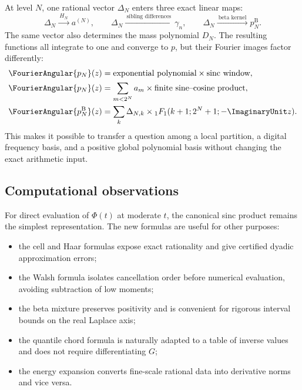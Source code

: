 \documentclass[11pt]{article}
\theoremstyle{definition}
\theoremstyle{remark}
\begin{document}
At level $N$, one rational vector $\Delta_N$ enters three exact linear maps:
\begin{equation}\label{p3:eq:commuting-maps}
 \Delta_N
 \xrightarrow{\ H_N\ }a^{(N)},
 \qquad
 \Delta_N\xrightarrow{\ \text{sibling differences}\ }\gamma_n,
 \qquad
 \Delta_N\xrightarrow{\ \text{beta kernel}\ }p_N^{\mathrm B}.
\end{equation}
The same vector also determines the mass polynomial $D_N$.  The resulting
functions all integrate to one and converge to $p$, but their Fourier images
factor differently:
\begin{align}
 \FourierAngular{p_N}(z)&=\text{exponential polynomial}\times\text{sinc window},
 \label{p3:eq:transform-type-cell}\\
 \FourierAngular{p_N}(z)&=\sum_{m<2^N}a_m\times\text{finite sine--cosine product},
 \label{p3:eq:transform-type-Walsh}\\
 \FourierAngular{p_N^{\mathrm B}}(z)&=\sum_k\Delta_{N,k}\times{}_1F_1(k+1;2^N+1;-\ImaginaryUnit z).
 \label{p3:eq:transform-type-beta}
\end{align}
This makes it possible to transfer a question among a local partition, a
digital frequency basis, and a positive global polynomial basis without
changing the exact arithmetic input.

\subsection{Computational observations}

For direct evaluation of $\Phi(t)$ at moderate $t$, the canonical sinc product
remains the simplest representation.  The new formulas are useful for other
purposes:
\begin{itemize}
\item the cell and Haar formulas expose exact rationality and give certified
      dyadic approximation errors;
\item the Walsh formula isolates cancellation order before numerical
      evaluation, avoiding subtraction of low moments;
\item the beta mixture preserves positivity and is convenient for rigorous
      interval bounds on the real Laplace axis;
\item the quantile chord formula is naturally adapted to a table of inverse
      values and does not require differentiating $G$;
\item the energy expansion converts fine-scale rational data into derivative
      norms and vice versa.
\end{itemize}
\end{document}
